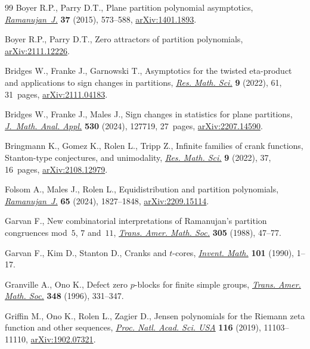 \documentclass[pdftex]{sigma}
\numberwithin{equation}{section}
\begin{document}
\begin{thebibliography}{99}
Boyer R.P., Parry D.T., Plane partition polynomial asymptotics,
 \href{https://doi.org/10.1007/s11139-014-9573-8}{\textit{Ramanujan~J.}} \textbf{37} (2015), 573--588, \href{https://arxiv.org/abs/1401.1893}{arXiv:1401.1893}.

Boyer R.P., Parry D.T., Zero attractors of partition polynomials,
 \href{https://arxiv.org/abs/2111.12226}{arXiv:2111.12226}.

Bridges W., Franke J., Garnowski T., Asymptotics for the twisted eta-product
 and applications to sign changes in partitions, \href{https://doi.org/10.1007/s40687-022-00355-x}{\textit{Res. Math. Sci.}}
 \textbf{9} (2022), 61, 31~pages, \href{https://arxiv.org/abs/2111.04183}{arXiv:2111.04183}.

Bridges W., Franke J., Males J., Sign changes in statistics for plane
 partitions, \href{https://doi.org/10.1016/j.jmaa.2023.127719}{\textit{J.~Math. Anal. Appl.}} \textbf{530} (2024), 127719,
 27~pages, \href{https://arxiv.org/abs/2207.14590}{arXiv:2207.14590}.

Bringmann K., Gomez K., Rolen L., Tripp Z., Infinite families of crank
 functions, {S}tanton-type conjectures, and unimodality, \href{https://doi.org/10.1007/s40687-022-00333-3}{\textit{Res. Math.
 Sci.}} \textbf{9} (2022), 37, 16~pages, \href{https://arxiv.org/abs/2108.12979}{arXiv:2108.12979}.

Folsom A., Males J., Rolen L., Equidistribution and partition polynomials,
 \href{https://doi.org/10.1007/s11139-023-00762-w}{\textit{Ramanujan~J.}} \textbf{65} (2024), 1827--1848, \href{https://arxiv.org/abs/2209.15114}{arXiv:2209.15114}.

Garvan F., New combinatorial interpretations of {R}amanujan's partition
 congruences mod~{$5$}, {$7$} and~{$11$}, \href{https://doi.org/10.2307/2001040}{\textit{Trans. Amer. Math. Soc.}}
 \textbf{305} (1988), 47--77.

Garvan F., Kim D., Stanton D., Cranks and {$t$}-cores, \href{https://doi.org/10.1007/BF01231493}{\textit{Invent. Math.}}
 \textbf{101} (1990), 1--17.

Granville A., Ono K., Defect zero {$p$}-blocks for finite simple groups,
 \href{https://doi.org/10.1090/S0002-9947-96-01481-X}{\textit{Trans. Amer. Math. Soc.}} \textbf{348} (1996), 331--347.

Griffin M., Ono K., Rolen L., Zagier D., Jensen polynomials for the {R}iemann
 zeta function and other sequences, \href{https://doi.org/10.1073/pnas.1902572116}{\textit{Proc. Natl. Acad. Sci. USA}}
 \textbf{116} (2019), 11103--11110, \href{https://arxiv.org/abs/1902.07321}{arXiv:1902.07321}.


\end{thebibliography}
\end{document}
